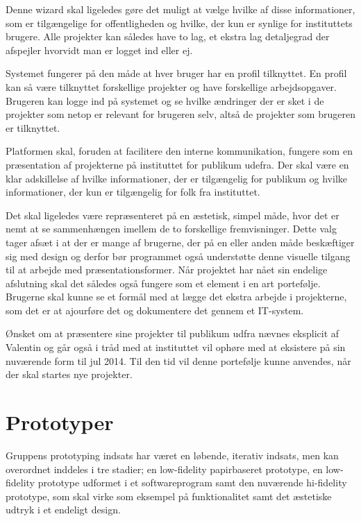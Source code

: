 Denne wizard skal ligeledes gøre det muligt at vælge hvilke af disse informationer, som er tilgængelige for offentligheden og hvilke, der kun er synlige for instituttets brugere. Alle projekter kan således have to lag, et ekstra lag detaljegrad der afspejler hvorvidt man er logget ind eller ej.

Systemet fungerer på den måde at hver bruger har en profil tilknyttet. En profil kan så være tilknyttet forskellige projekter og have forskellige arbejdsopgaver. Brugeren kan logge ind på systemet og se hvilke ændringer der er sket i de projekter som netop er relevant for brugeren selv, altså de projekter som brugeren er tilknyttet.

Platformen skal, foruden at facilitere den interne kommunikation, fungere som en præsentation af projekterne på instituttet for publikum udefra. Der skal være en klar adskillelse af hvilke informationer, der er tilgængelig for publikum og hvilke informationer, der kun er tilgængelig for folk fra instituttet. 

Det skal ligeledes være repræsenteret på en æstetisk, simpel måde, hvor det er nemt at se sammenhængen imellem de to forskellige fremvisninger. Dette valg tager afsæt i at der er mange af brugerne, der på en eller anden måde beskæftiger sig med design og derfor bør programmet også understøtte denne visuelle tilgang til at arbejde med præsentationsformer.
Når projektet har nået sin endelige afslutning skal det således også fungere som et element i en art portefølje. Brugerne skal kunne se et formål med at lægge det ekstra arbejde i projekterne, som det er at ajourføre det og dokumentere det gennem et IT-system.

Ønsket om at præsentere sine projekter til publikum udfra nævnes eksplicit af Valentin og går også i tråd med at instituttet vil ophøre med at eksistere på sin nuværende form til jul 2014. Til den tid vil denne portefølje kunne anvendes, når der skal startes nye projekter. 

\section{Prototyper}
Gruppens prototyping indsats har været en løbende, iterativ indsats, men kan overordnet inddeles i tre stadier; en low-fidelity papirbaseret prototype, en low-fidelity prototype udformet i et softwareprogram samt den nuværende hi-fidelity prototype, som skal virke som eksempel på funktionalitet samt det æstetiske udtryk i et endeligt design.

